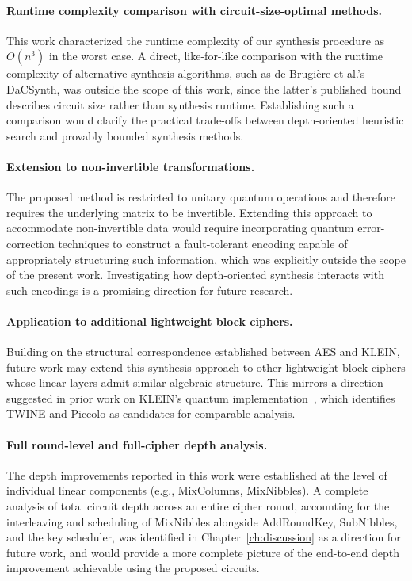 \paragraph{Runtime complexity comparison with circuit-size-optimal methods.}
This work characterized the runtime complexity of our synthesis procedure as $O(n^3)$ in the worst case. A direct, like-for-like comparison with the runtime complexity of alternative synthesis algorithms, such as de Brugière et al.'s DaCSynth, was outside the scope of this work, since the latter's published bound describes circuit size rather than synthesis runtime. Establishing such a comparison would clarify the practical trade-offs between depth-oriented heuristic search and provably bounded synthesis methods.

\paragraph{Extension to non-invertible transformations.}
The proposed method is restricted to unitary quantum operations and therefore requires the underlying matrix to be invertible. Extending this approach to accommodate non-invertible data would require incorporating quantum error-correction techniques to construct a fault-tolerant encoding capable of appropriately structuring such information, which was explicitly outside the scope of the present work. Investigating how depth-oriented synthesis interacts with such encodings is a promising direction for future research.

\paragraph{Application to additional lightweight block ciphers.}
Building on the structural correspondence established between AES and KLEIN, future work may extend this synthesis approach to other lightweight block ciphers whose linear layers admit similar algebraic structure. This mirrors a direction suggested in prior work on KLEIN's quantum implementation~\cite{cryptoeprint:2026/1007}, which identifies TWINE and Piccolo as candidates for comparable analysis.

\paragraph{Full round-level and full-cipher depth analysis.}
The depth improvements reported in this work were established at the level of individual linear components (e.g., MixColumns, MixNibbles). A complete analysis of total circuit depth across an entire cipher round, accounting for the interleaving and scheduling of MixNibbles alongside AddRoundKey, SubNibbles, and the key scheduler, was identified in Chapter~\ref{ch:discussion} as a direction for future work, and would provide a more complete picture of the end-to-end depth improvement achievable using the proposed circuits.

